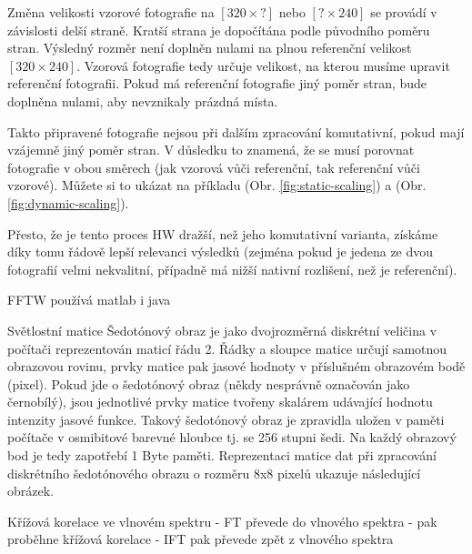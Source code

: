 Změna velikosti vzorové fotografie na $ [320 × ?] $ nebo $ [? × 240] $ se provádí v závislosti delší straně. Kratší strana je dopočítána podle původního poměru stran. Výsledný rozměr není doplněn nulami na plnou referenční velikost $ [320 × 240] $. Vzorová fotografie tedy určuje velikost, na kterou musíme upravit referenční fotografii. Pokud má referenční fotografie jiný poměr stran, bude doplněna nulami, aby nevznikaly prázdná místa.

Takto připravené fotografie nejsou při dalším zpracování komutativní, pokud mají vzájemně jiný poměr stran. V důsledku to znamená, že se musí porovnat fotografie v obou směrech (jak vzorová vůči referenční, tak referenční vůči vzorové). Můžete si to ukázat na příkladu (Obr. \ref{fig:static-scaling}) a (Obr. \ref{fig:dynamic-scaling}).




Přesto, že je tento proces HW dražší, než jeho komutativní varianta, získáme díky tomu řádově lepší relevanci výsledků (zejména pokud je jedena ze dvou fotografií velmi nekvalitní, případně má nižší nativní rozlišení, než je referenční).


FFTW
používá matlab i java


Světlostní matice
Šedotónový obraz je jako dvojrozměrná diskrétní veličina v počítači reprezentován maticí řádu 2. Řádky a sloupce matice určují samotnou obrazovou rovinu, prvky matice pak jasové hodnoty v příslušném obrazovém bodě (pixel). Pokud jde o šedotónový obraz (někdy nesprávně označován jako černobílý), jsou jednotlivé prvky matice tvořeny skalárem udávající hodnotu intenzity jasové funkce. Takový šedotónový obraz je zpravidla uložen v paměti počítače v osmibitové barevné hloubce tj. se 256 stupni šedi. Na každý obrazový bod je tedy zapotřebí 1 Byte paměti. Reprezentaci matice dat při zpracování diskrétního šedotónového obrazu o rozměru 8x8 pixelů ukazuje následující obrázek.

Křížová korelace ve vlnovém spektru
- FT převede do vlnového spektra
- pak proběhne křížová korelace
- IFT pak převede zpět z vlnového spektra

